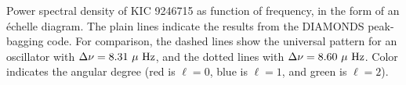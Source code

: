 \label{fig:appendixfig}
Power spectral density of KIC 9246715 as function of frequency, in the form of an \'echelle diagram. The plain lines indicate the results from the DIAMONDS peak-bagging code. For comparison, the dashed lines show the universal pattern for an oscillator with $\Delta \nu = 8.31 \ \mu \ \rm{Hz}$, and the dotted lines with $\Delta \nu = 8.60 \ \mu \ \rm{Hz}$. Color indicates the angular degree (red is $\ell=0$, blue is $\ell=1$, and green is $\ell=2$).